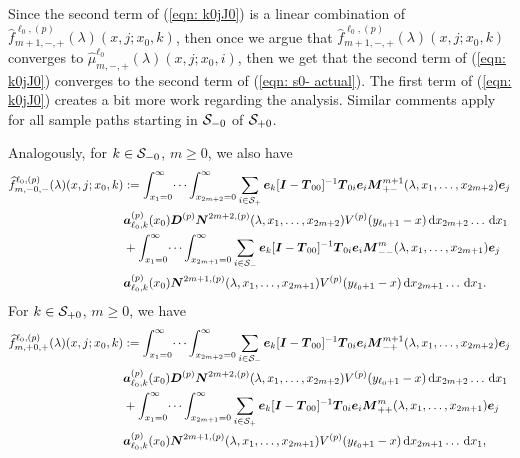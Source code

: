 Since the second term of (\ref{eqn: k0jJ0}) is a linear combination of \(\widehat{f}_{m+1,-,+}^{\ell_0,(p)}(\lambda)(x,j;x_0,k)\), then once we argue that \(\widehat{f}_{m+1,-,+}^{\ell_0,(p)}(\lambda)(x,j;x_0,k)\) converges to \(\widehat \mu_{m,-,+}^{\ell_0}(\lambda)(x,j;x_0,i)\), then we get that the second term of (\ref{eqn: k0jJ0}) converges to the second term of (\ref{eqn: s0- actual}). The first term of (\ref{eqn: k0jJ0}) creates a bit more work regarding the analysis. Similar comments apply for all sample paths starting in \(\mathcal{S}_{-0}\) of \(\mathcal{S}_{+0}\).

Analogously, for \(k\in\mathcal{S}_{-0}\), \(m\geq 0\), we also have 
\begin{align*}
	\widehat{f}_{m,-0,-}^{\ell_0,(p)}(\lambda)(x,j;x_0,k)\nonumber 
	&:=\int_{x_1=0}^\infty \dots \int_{x_{2m+2}=0}^\infty \sum_{i\in\mathcal{S}_+}\boldsymbol e_k [\boldsymbol I - \boldsymbol T_{00}]^{-1}\boldsymbol T_{0i}\boldsymbol e_i \boldsymbol M^{m+1}_{+-}(\lambda,x_1,\dots,x_{2m+2})\boldsymbol e_j \nonumber
	\\& \boldsymbol a_{\ell_0,k}^{(p)}(x_0) \boldsymbol D^{(p)} \boldsymbol N^{2m+2,(p)}(\lambda,x_1,\dots,x_{2m+2}) V^{(p)}(y_{\ell_0+1}-x)\, \mathrm{d} x_{2m+2}\dots  \, \mathrm{d} x_1  \nonumber
	\\& + \int_{x_1=0}^\infty \dots \int_{x_{2m+1}=0}^\infty \sum_{i\in\mathcal{S}_-} \boldsymbol e_k [\boldsymbol I - \boldsymbol T_{00}]^{-1}\boldsymbol T_{0i}\boldsymbol e_i \boldsymbol M^{m}_{--}(\lambda,x_1,\dots,x_{2m+1})\boldsymbol e_j \nonumber
	\\& \boldsymbol a_{\ell_0,k}^{(p)}(x_0)\boldsymbol N^{2m+1,(p)}(\lambda,x_1,\dots,x_{2m+1}) V^{(p)}(y_{\ell_0+1}-x)\, \mathrm{d} x_{2m+1}\dots\, \mathrm{d} x_1.
\end{align*}
For \(k\in\mathcal{S}_{+0}\), \(m\geq 0\), we have 
\begin{align*}
	\widehat{f}_{m,+0,+}^{\ell_0,(p)}(\lambda)(x,j;x_0,k)\nonumber 
	&:=\int_{x_1=0}^\infty \dots \int_{x_{2m+2}=0}^\infty \sum_{i\in\mathcal{S}_-} \boldsymbol e_k [\boldsymbol I - \boldsymbol T_{00}]^{-1}\boldsymbol T_{0i}\boldsymbol e_i \boldsymbol M^{m+1}_{-+}(\lambda,x_1,\dots,x_{2m+2})\boldsymbol e_j \nonumber
	\\& \boldsymbol a_{\ell_0,k}^{(p)}(x_0) \boldsymbol D^{(p)} \boldsymbol N^{2m+2,(p)}(\lambda,x_1,\dots,x_{2m+2}) V^{(p)}(y_{\ell_0+1}-x)\, \mathrm{d} x_{2m+2}\dots  \, \mathrm{d} x_1  \nonumber
	\\& + \int_{x_1=0}^\infty \dots \int_{x_{2m+1}=0}^\infty \sum_{i\in\mathcal{S}_+} \boldsymbol e_k [\boldsymbol I - \boldsymbol T_{00}]^{-1}\boldsymbol T_{0i}\boldsymbol e_i \boldsymbol M^m_{++}(\lambda,x_1,\dots,x_{2m+1})\boldsymbol e_j \nonumber
	\\& \boldsymbol a_{\ell_0,k}^{(p)}(x_0)\boldsymbol N^{2m+1,(p)}(\lambda,x_1,\dots,x_{2m+1}) V^{(p)}(y_{\ell_0+1}-x)\, \mathrm{d} x_{2m+1}\dots  \, \mathrm{d} x_1,
\end{align*}

